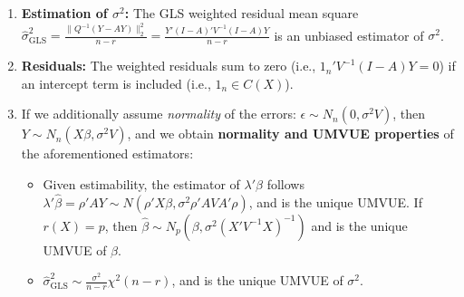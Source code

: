 \documentclass{article}
\theoremstyle{break}
\begin{document}
\begin{enumerate}
    \footnote{In particular, the unique GLS estimator of $\mu = X\beta$ is $X\hat\beta = AY$.}
    \item \textbf{Estimation of $\sigma^2$:} The GLS weighted residual mean square
    $\hat\sigma^2_{\mathrm{GLS}} = \frac{\|Q^{-1}(Y-AY)\|_2^2}{n-r} = \frac{Y'(I-A)'V^{-1}(I-A)Y}{n-r}$ is an unbiased estimator of $\sigma^2$.
    \item \textbf{Residuals:} The weighted residuals sum to zero (i.e., $1_n'V^{-1}(I-A)Y = 0$) if an intercept term is included (i.e., $1_n \in C(X)$). 
    \item If we additionally assume \emph{normality} of the errors: $\epsilon \sim N_n(0, \sigma^2 V)$, then $Y \sim N_n(X\beta, \sigma^2 V)$, and we obtain \textbf{normality and UMVUE properties} of the aforementioned estimators: 
    \begin{itemize}
        \item Given estimability, the estimator of $\lambda'\beta$ follows $\lambda'\hat\beta = \rho'AY \sim N(\rho'X\beta, \sigma^2 \rho'AVA'\rho)$, and is the unique UMVUE. 
        If $r(X)=p$, then $\hat\beta \sim N_p(\beta, \sigma^2 (X' V^{-1} X)^{-1})$ and is the unique UMVUE of $\beta$.
        \item $\hat\sigma^2_{\mathrm{GLS}} \sim \frac{\sigma^2}{n-r}\chi^2(n-r)$, and is the unique UMVUE of $\sigma^2$.
    \end{itemize}
\end{enumerate}
\end{document}
